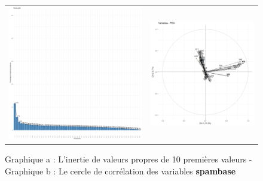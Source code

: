 \documentclass[a4paper,11pt,oneside,roman]{article}
\begin{document}
\begin{figure}[htb]
    \centering
    \begin{tabular}{c|c}
    \includegraphics[scale = .2]{./discrimination/spambase/eig_plot.png} &
    \includegraphics[scale = .3]{discrimination/spambase/var_plot.png}
    \end{tabular}
    \caption{Graphique a : L'inertie de valeurs propres de 10 premières valeurs - Graphique b : Le cercle de corrélation des variables \textbf{spambase}}
    \label{fig:my_label}
\end{figure}
\end{document}
